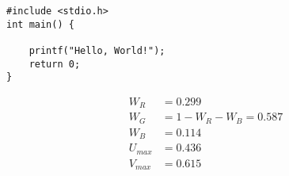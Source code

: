 \begin{lstlisting}
#include <stdio.h>
int main() {

    printf("Hello, World!");
    return 0;
}
\end{lstlisting}



\renewcommand{\sfdefault}{cmr}

\begin{equation}
  \begin{aligned}
    W_R &= 0.299 \\
    W_G &= 1 - W_R - W_B = 0.587 \\
    W_B &= 0.114 \\
    U_{max} &= 0.436 \\
    V_{max} &= 0.615
    \label{yuv_constants}
  \end{aligned}
\end{equation}
